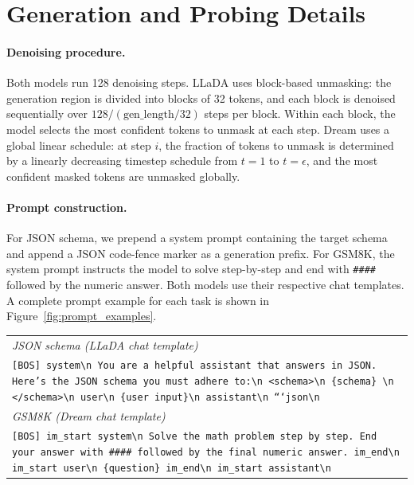 \documentclass[11pt]{article}
\makeatletter
\providecommand{\linenumbers}{}
\providecommand{\nolinenumbers}{}
\let\old@figure\figure
\let\old@endfigure\endfigure
\renewenvironment{figure}[1][]{%
  \nolinenumbers\old@figure[#1]%
}{%
  \old@endfigure\linenumbers%
}
\makeatother
\begin{document}
\section{Generation and Probing Details}
\label{sec:appendix_generation}

\paragraph{Denoising procedure.}
Both models run 128 denoising steps.
LLaDA uses block-based unmasking: the generation region is divided into blocks of 32 tokens, and each block is denoised sequentially over $128 / (\text{gen\_length} / 32)$ steps per block.
Within each block, the model selects the most confident tokens to unmask at each step.
Dream uses a global linear schedule: at step $i$, the fraction of tokens to unmask is determined by a linearly decreasing timestep schedule from $t=1$ to $t=\epsilon$, and the most confident masked tokens are unmasked globally.

\paragraph{Prompt construction.}
For JSON schema, we prepend a system prompt containing the target schema and append a JSON code-fence marker as a generation prefix.
For GSM8K, the system prompt instructs the model to solve step-by-step and end with \texttt{\#\#\#\#} followed by the numeric answer.
Both models use their respective chat templates.
A complete prompt example for each task is shown in Figure~\ref{fig:prompt_examples}.

\begin{figure}[!b]
\small
\begin{tabular}{p{}}
\toprule
\textit{JSON schema (LLaDA chat template)} \\[2pt]
\texttt{[BOS] system\textbackslash n You are a helpful assistant that answers in JSON. Here's the JSON schema you must adhere to:\textbackslash n <schema>\textbackslash n \{schema\} \textbackslash n </schema>\textbackslash n user\textbackslash n \{user input\}\textbackslash n assistant\textbackslash n ```json\textbackslash n} \\[2pt]
\midrule
\textit{GSM8K (Dream chat template)} \\[2pt]
\texttt{[BOS] im\_start system\textbackslash n Solve the math problem step by step. End your answer with \#\#\#\# followed by the final numeric answer. im\_end\textbackslash n im\_start user\textbackslash n \{question\} im\_end\textbackslash n im\_start assistant\textbackslash n} \\
\bottomrule
\end{tabular}
\caption{Schematic prompt examples after each model's chat template is applied (special tokens shown as plain words for readability; the actual tokens used are model-specific control tokens). The generation region ($\!\le\!256$ masked tokens) is appended after the final assistant marker. Both models share the same system/user content; only the wrapping tokens differ.}
\label{fig:prompt_examples}
\end{figure}
\end{document}
